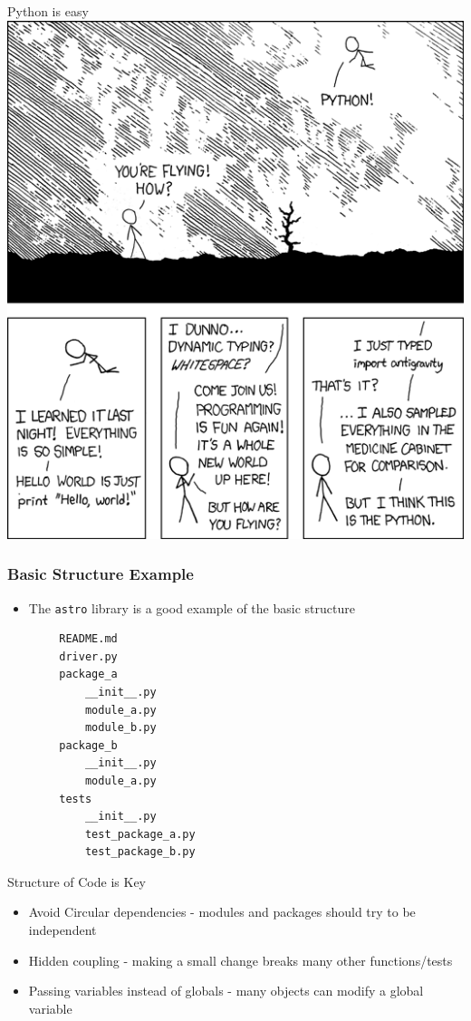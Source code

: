 \documentclass[11pt,professionalfonts]{beamer}
\begin{document}
\begin{frame}{Python is easy}
    \centering
    \includegraphics[height=0.8\textheight]{figures/python_xkcd.png}
\end{frame}

\begin{frame}[fragile]\frametitle{Basic Structure Example}
    \begin{itemize}
        \item The \texttt{astro} library is a good example of the basic structure
    \end{itemize}
    \begin{verbatim}
        README.md
        driver.py
        package_a
            __init__.py
            module_a.py
            module_b.py
        package_b
            __init__.py
            module_a.py
        tests
            __init__.py
            test_package_a.py
            test_package_b.py
    \end{verbatim}
\end{frame}

\begin{frame}{Structure of Code is Key}
    \begin{itemize}
        \item Avoid Circular dependencies - modules and packages should try to be independent
        \item Hidden coupling - making a small change breaks many other functions/tests
        \item Passing variables instead of globals - many objects can modify a global variable
    \end{itemize}
\end{frame}
\end{document}
